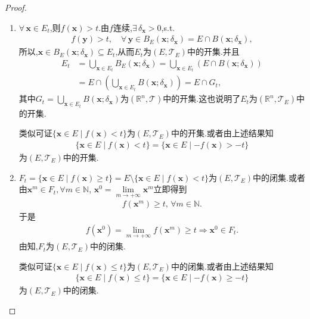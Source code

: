 \documentclass[../../main.tex]{subfiles}%
\begin{document}
\begin{proof}
\begin{enumerate}[(1)]
\item $\forall\,\boldsymbol{x}\in E_t$,则$f(\boldsymbol{x})>t$.由$f$连续,$\exists\,\delta_{\boldsymbol{x}}>0$,s.t.
\begin{align*}
f(\boldsymbol{y})>t,\quad \forall\,\boldsymbol{y}\in B_E(\boldsymbol{x};\delta_{\boldsymbol{x}})=E\cap B(\boldsymbol{x};\delta_{\boldsymbol{x}}),
\end{align*}
所以,$\boldsymbol{x}\in B_E(\boldsymbol{x};\delta_{\boldsymbol{x}})\subseteq E_t$,从而$E_t$为$(E,\mathscr{T}_E)$中的开集.并且
\begin{align*}
E_t&=\bigcup_{\boldsymbol{x}\in E_t}B_E(\boldsymbol{x};\delta_{\boldsymbol{x}})=\bigcup_{\boldsymbol{x}\in E_t}(E\cap B(\boldsymbol{x};\delta_{\boldsymbol{x}}))\\
&=E\cap\left(\bigcup_{\boldsymbol{x}\in E_t}B(\boldsymbol{x};\delta_{\boldsymbol{x}})\right)=E\cap G_t,
\end{align*}
其中$G_t=\bigcup_{\boldsymbol{x}\in E_t}B(\boldsymbol{x};\delta_{\boldsymbol{x}})$为$(\mathbb{R}^n,\mathscr{T})$中的开集.这也说明了$E_t$为$(\mathbb{R}^n,\mathscr{T}_E)$中的开集.

类似可证$\{\boldsymbol{x}\in E\mid f(\boldsymbol{x})<t\}$为$(E,\mathscr{T}_E)$中的开集.或者由上述结果知
\begin{align*}
\{\boldsymbol{x}\in E\mid f(\boldsymbol{x})<t\}=\{\boldsymbol{x}\in E\mid -f(\boldsymbol{x})>-t\}
\end{align*}
为$(E,\mathscr{T}_E)$中的开集.

\item $F_t=\{\boldsymbol{x}\in E\mid f(\boldsymbol{x})\geqslant t\}=E\setminus\{\boldsymbol{x}\in E\mid f(\boldsymbol{x})<t\}$为$(E,\mathscr{T}_E)$中的闭集.或者由$\boldsymbol{x}^m\in F_t,\forall m\in \mathbb{N}$,$\,\,\boldsymbol{x}^0=\lim\limits_{m\to+\infty}\boldsymbol{x}^m$立即得到
\begin{align*}
f(\boldsymbol{x}^m)\geqslant t,\,\forall m\in \mathbb{N}.
\end{align*}
于是
\begin{align*}
f(\boldsymbol{x}^0)=\lim\limits_{m\to+\infty}f(\boldsymbol{x}^m)\geqslant t\Longrightarrow \boldsymbol{x}^0\in F_t.
\end{align*}
由知,$F_t$为$(E,\mathscr{T}_E)$中的闭集.

类似可证$\{\boldsymbol{x}\in E\mid f(\boldsymbol{x})\leqslant t\}$为$(E,\mathscr{T}_E)$中的闭集.或者由上述结果知
\begin{align*}
\{\boldsymbol{x}\in E\mid f(\boldsymbol{x})\leqslant t\}=\{\boldsymbol{x}\in E\mid -f(\boldsymbol{x})\geqslant -t\}
\end{align*}
为$(E,\mathscr{T}_E)$中的闭集.
\end{enumerate}

\end{proof}
\end{document}
